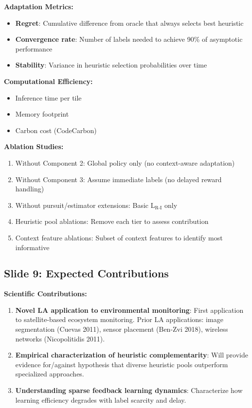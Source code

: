 \documentclass[11pt]{article}
\begin{document}
\textbf{Adaptation Metrics:}
\begin{itemize}
    \item \textbf{Regret}: Cumulative difference from oracle that always selects best heuristic
    \item \textbf{Convergence rate}: Number of labels needed to achieve 90\% of asymptotic performance
    \item \textbf{Stability}: Variance in heuristic selection probabilities over time
\end{itemize}

\textbf{Computational Efficiency:}
\begin{itemize}
    \item Inference time per tile
    \item Memory footprint
    \item Carbon cost (CodeCarbon)
\end{itemize}

\textbf{Ablation Studies:}
\begin{enumerate}
    \item Without Component 2: Global policy only (no context-aware adaptation)
    \item Without Component 3: Assume immediate labels (no delayed reward handling)
    \item Without pursuit/estimator extensions: Basic L$_{\text{R-I}}$ only
    \item Heuristic pool ablations: Remove each tier to assess contribution
    \item Context feature ablations: Subset of context features to identify most informative
\end{enumerate}

\subsection{Slide 9: Expected Contributions}

\textbf{Scientific Contributions:}
\begin{enumerate}
    \item \textbf{Novel LA application to environmental monitoring}: First application to satellite-based ecosystem monitoring. Prior LA applications: image segmentation (Cuevas 2011), sensor placement (Ben-Zvi 2018), wireless networks (Nicopolitidis 2011).

    \item \textbf{Empirical characterization of heuristic complementarity}: Will provide evidence for/against hypothesis that diverse heuristic pools outperform specialized approaches.

    \item \textbf{Understanding sparse feedback learning dynamics}: Characterize how learning efficiency degrades with label scarcity and delay.
\end{enumerate}
\end{document}
